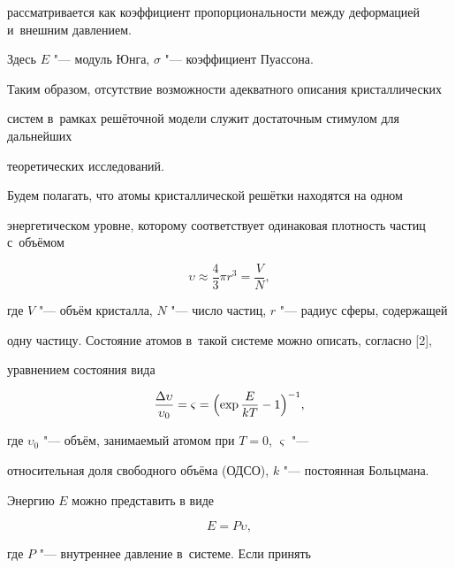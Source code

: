 рассматривается как коэффициент пропорциональности между деформацией и~внешним давлением. 

Здесь $E$ "--- модуль Юнга, $\sigma $ "--- коэффициент Пуассона.



Таким образом, отсутствие возможности адекватного описания кристаллических 

систем в~рамках решёточной модели служит достаточным стимулом для дальнейших 

теоретических исследований.




Будем полагать, что атомы кристаллической решётки находятся на одном 

энергетическом уровне, которому соответствует одинаковая плотность частиц с~объёмом

\begin{equation}

\label{eq6}

\upsilon \approx \frac43\pi r^3=\frac VN,

\end{equation}

где $V$ "--- объём кристалла, $N$ "--- число частиц, $r$ "--- радиус сферы, содержащей 

одну частицу. Состояние атомов в~такой системе можно описать, согласно [2], 

уравнением состояния вида

\begin{equation}

\label{eq7}

\frac{\Delta \upsilon }{\upsilon _0 }=\varsigma =\Bigl( \exp 

\frac{E}{kT}-1 \Bigr)^{-1},

\end{equation}

где $\upsilon _0 $ "--- объём, занимаемый атомом при $T = 0$, $\varsigma $ "--- 

относительная доля свободного объёма (ОДСО), $k$ "--- постоянная Больцмана. 

Энергию $E$ можно представить в виде

\begin{equation}

 E=P \upsilon,

\end{equation}

где $P$ "--- внутреннее давление в~системе. Если принять

